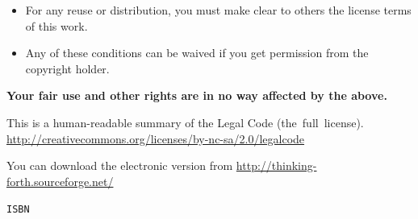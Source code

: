 \begin{itemize}
\item For any reuse or distribution, you must make clear to others the
license terms of this work.
 
\item Any of these conditions can be waived if you get permission from the copyright holder.
\end{itemize}

\begin{center}
\textbf{Your fair use and other rights are in no way affected by the above.}

\medskip
This is a human-readable summary of the Legal Code
{\def\UrlLeft#1\UrlRight{(the\ full\ license).}
\url{http://creativecommons.org/licenses/by-nc-sa/2.0/legalcode}}

\bigskip
\vfill
You can download the electronic version from
\url{http://thinking-forth.sourceforge.net/}

\bigskip

{\tt ISBN \isbn}

\end{center}
